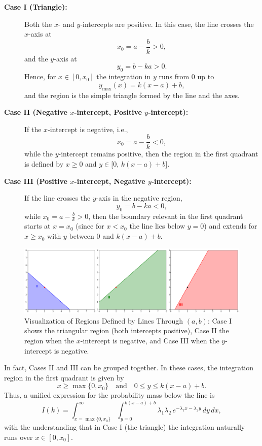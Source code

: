 \begin{description}
  \item[\textbf{Case I (Triangle):}] Both the \(x\)- and \(y\)-intercepts are positive. In this case, the line crosses the \(x\)-axis at
  \[
  x_0 = a - \frac{b}{k} > 0,
  \]
  and the \(y\)-axis at
  \[
  y_0 = b - ka > 0.
  \]
  Hence, for \(x\in[0,x_0]\) the integration in \(y\) runs from \(0\) up to 
  \[
  y_{\max}(x)=k(x-a)+b,
  \]
  and the region is the simple triangle formed by the line and the axes.

  \item[\textbf{Case II (Negative \(x\)-intercept, Positive \(y\)-intercept):}] If the \(x\)-intercept is negative, i.e.,
  \[
  x_0 = a - \frac{b}{k} < 0,
  \]
  while the \(y\)-intercept remains positive, then the region in the first quadrant is defined by \(x\ge0\) and \(y\in\bigl[0,\,k(x-a)+b\bigr]\).

  \item[\textbf{Case III (Positive \(x\)-intercept, Negative \(y\)-intercept):}] If the line crosses the \(y\)-axis in the negative region,
  \[
  y_0 = b - ka < 0,
  \]
  while \(x_0 = a - \frac{b}{k} > 0\), then the boundary relevant in the first quadrant starts at \(x=x_0\) (since for \(x<x_0\) the line lies below \(y=0\)) and extends for \(x\ge x_0\) with \(y\) between 0 and \(k(x-a)+b\).
\end{description}

\begin{figure}[h]
  \centering
  \includegraphics[width=1.0\textwidth]{images/picture1.png}
  \caption{Visualization of Regions Defined by Lines Through \((a,b)\): Case I shows the triangular region (both intercepts positive), Case II the region when the \(x\)-intercept is negative, and Case III when the \(y\)-intercept is negative.}
  \label{fig:regions}
\end{figure}

In fact, Cases II and III can be grouped together. In these cases, the integration region in the first quadrant is given by
\[
  x \ge \max\{0,x_0\} \quad \text{and} \quad 0\le y \le k(x-a)+b.
\]
Thus, a unified expression for the probability mass below the line is
\begin{equation}\label{eq:Ik_general}
  I(k)=\int_{x=\max\{0,x_0\}}^{\infty} \int_{y=0}^{k(x-a)+b} \lambda_1 \lambda_2 \, e^{-\lambda_1 x-\lambda_2 y} \, dy\,dx,
\end{equation}
with the understanding that in Case I (the triangle) the integration naturally runs over \(x\in[0,x_0]\).

